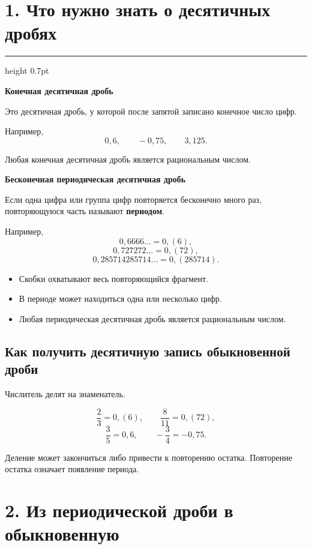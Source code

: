 \documentclass[a4paper,12pt]{article}
\newcommand{\checkitem}{\(\square\)}
\newcommand{\key}[1]{%
    \par\medskip
    {\color{darkaccent}\bfseries #1}
    \par\smallskip
}
\newcommand{\ruleline}{%
    \par\medskip
    {\color{accent}\hrule height 0.7pt}
    \medskip
}
\begin{document}

\section*{\textcolor{darkaccent}{1. Что нужно знать о десятичных дробях}}

\ruleline

\key{Конечная десятичная дробь}

Это десятичная дробь, у которой после запятой записано конечное
число цифр.

Например,
\[
0{,}6,\qquad
-0{,}75,\qquad
3{,}125.
\]

Любая конечная десятичная дробь является рациональным числом.

\key{Бесконечная периодическая десятичная дробь}

Если одна цифра или группа цифр повторяется бесконечно много раз,
повторяющуюся часть называют \textbf{периодом}.

Например,
\[
0{,}6666\ldots=0{,}(6),
\]
\[
0{,}727272\ldots=0{,}(72),
\]
\[
0{,}285714285714\ldots=0{,}(285714).
\]

\begin{itemize}
    \item[\checkitem] Скобки охватывают весь повторяющийся фрагмент.
    \item[\checkitem] В периоде может находиться одна или несколько цифр.
    \item[\checkitem] Любая периодическая десятичная дробь является рациональным числом.
\end{itemize}

\subsection*{\textcolor{darkaccent}{Как получить десятичную запись обыкновенной дроби}}

Числитель делят на знаменатель.

\[
\frac{2}{3}=0{,}(6),
\qquad
\frac{8}{11}=0{,}(72),
\]
\[
\frac{3}{5}=0{,}6,
\qquad
-\frac34=-0{,}75.
\]

Деление может закончиться либо привести к повторению остатка.
Повторение остатка означает появление периода.


\section*{\textcolor{darkaccent}{2. Из периодической дроби в обыкновенную}}
\end{document}

